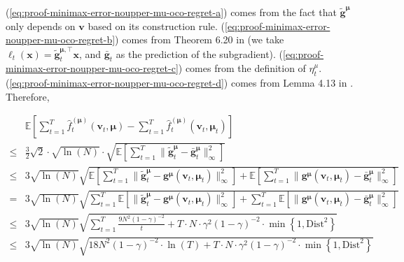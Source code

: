 \documentclass[12pt]{article}
\begin{document}
(\ref{eq:proof-minimax-error-noupper-mu-oco-regret-a}) comes from the fact that $\tilde{\boldsymbol{g}}^{\boldsymbol{\mu}}$ only depends on $\boldsymbol{v}$ based on its construction rule. (\ref{eq:proof-minimax-error-noupper-mu-oco-regret-b}) comes from Theorem 6.20 in \cite{orabona2019modern} (we take $\ell_t(\boldsymbol{x}) = \tilde{\boldsymbol{g}}_t^{\boldsymbol{\mu},\top}\boldsymbol{x}$, and $\bar{\boldsymbol{g}}_t$ as the prediction of the subgradient). (\ref{eq:proof-minimax-error-noupper-mu-oco-regret-c}) comes from the definition of $\eta_t^{\mu}$. (\ref{eq:proof-minimax-error-noupper-mu-oco-regret-d}) comes from Lemma 4.13 in \cite{orabona2019modern}. Therefore,

\begin{subequations}
    \begin{align}
    & \mathbb{E}\left [ \sum_{t=1}^T  \hat{f}^{(\boldsymbol{\mu})}_t(\boldsymbol{v}_t,\boldsymbol{\mu}) -  \sum_{t=1}^T \hat{f}^{(\boldsymbol{\mu})}_t(\boldsymbol{v}_t,\boldsymbol{\mu}_t)  \right]  \nonumber \\
    \le & \frac{3}{2}\sqrt{2} \cdot \sqrt{\ln(N)} \cdot \sqrt{\mathbb{E} \left[\sum_{t=1}^T \|\tilde{\boldsymbol{g}}_t^{\boldsymbol{\mu}}  - \bar{\boldsymbol{g}}_t^{\boldsymbol{\mu}}\|_{\infty}^2\right]} \label{eq:proof-minimax-error-noupper-mu-error-a} \\
     \le & 3 \sqrt{\ln(N)}  \sqrt{\mathbb{E} \left[\sum_{t=1}^T  \|\tilde{\boldsymbol{g}}_t^{\boldsymbol{\mu}}  - \boldsymbol{g}^{\boldsymbol{\mu}}(\boldsymbol{v}_t,\boldsymbol{\mu}_t) \|_{\infty}^2\right] + \mathbb{E} \left[\sum_{t=1}^T  \| \boldsymbol{g}^{\boldsymbol{\mu}}(\boldsymbol{v}_t,\boldsymbol{\mu}_t) -\bar{\boldsymbol{g}}_t^{\boldsymbol{\mu}}\|_{\infty}^2\right]} \label{eq:proof-minimax-error-noupper-mu-error-b}\\
    = & 3 \sqrt{\ln(N)}  \sqrt{\sum_{t=1}^T  \mathbb{E}\left[\|\tilde{\boldsymbol{g}}_t^{\boldsymbol{\mu}}  - \boldsymbol{g}^{\boldsymbol{\mu}}(\boldsymbol{v}_t,\boldsymbol{\mu}_t) \|_{\infty}^2\right ] + \sum_{t=1}^T  \mathbb{E} \left [\| \boldsymbol{g}^{\boldsymbol{\mu}}(\boldsymbol{v}_t,\boldsymbol{\mu}_t) -\bar{\boldsymbol{g}}_t^{\boldsymbol{\mu}}\|_{\infty}^2\right]} \nonumber \\
    \le & 3 \sqrt{\ln(N)}  \sqrt{\sum_{t=1}^T  \frac{9N^2(1-\gamma)^{-2}}{t} + T \cdot N \cdot \gamma^2(1-\gamma)^{-2} \cdot \min \left \{1,\text{Dist}^2 \right\}}  \label{eq:proof-minimax-error-noupper-mu-error-c} \\
    \le & 3 \sqrt{\ln(N)}  \sqrt{18N^2(1-\gamma)^{-2}\cdot 
    \ln(T) + T \cdot N \cdot \gamma^2(1-\gamma)^{-2} \cdot \min \left \{1,\text{Dist}^2 \right\}} \nonumber
    \end{align}
    \label{eq:proof-minimax-error-noupper-mu-error}
\end{subequations}
\end{document}
